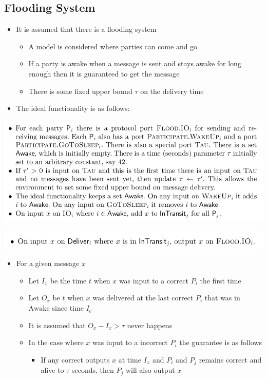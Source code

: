 \documentclass[11pt]{article}
\begin{document}
\subsection{Flooding System}
\label{sec:orgf863b05}
\begin{itemize}
\item It is assumed that there is a flooding system
\begin{itemize}
\item A model is considered where parties can come and go
\item If a party is awake when a message is sent and stays awake for long enough then it is guaranteed to get the message
\item There is some fixed upper bound \(\tau\) on the delivery time
\end{itemize}

\item The ideal functionality is as follows:
\end{itemize}
\begin{center}
\includegraphics[width=.9\linewidth]{State Machine Replication (10)/screenshot_2018-10-28_08-26-45.png}
\end{center}
\begin{center}
\includegraphics[width=.9\linewidth]{State Machine Replication (10)/screenshot_2018-10-28_08-26-57.png}
\end{center}


\begin{itemize}
\item For a given message \(x\)
\begin{itemize}
\item Let \(I_x\) be the time \(t\) when \(x\) was input to a correct \(P_i\) the first time
\item Let \(O_x\) be \(t\) when \(x\) was delivered at the last correct \(P_i\) that was in \(\text{Awake}\) since time \(I_c\)
\item It is assumed that \(O_x-I_x > \tau\) never happens
\item In the case where \(x\) was input to a incorrect \(P_i\) the guarantee is as follows
\begin{itemize}
\item If any correct outputs \(x\) at time \(I_x\) and \(P_i\) and \(P_j\) remains correct and alive to \(\tau\) seconds, then \(P_j\) will also output \(x\)
\end{itemize}
\end{itemize}
\end{itemize}
\end{document}
